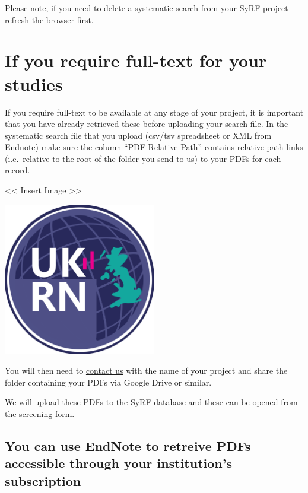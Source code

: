 \documentclass[
]{book}
\begin{document}
Please note, if you need to delete a systematic search from your SyRF project refresh the browser first.

\hypertarget{if-you-require-full-text-for-your-studies}{%
\section{If you require full-text for your studies}\label{if-you-require-full-text-for-your-studies}}

If you require full-text to be available at any stage of your project, it is important that you have already retrieved these before uploading your search file. In the systematic search file that you upload (csv/tsv spreadsheet or XML from Endnote) make sure the column ``PDF Relative Path'' contains relative path links (i.e.~relative to the root of the folder you send to us) to your PDFs for each record.

\textless{}\textless{} Insert Image \textgreater{}\textgreater{}

\includegraphics[width=0.5\textwidth,height=0.5\textheight]{figs/evidence-triangle.png}

You will then need to \href{syrf.info@ed.ac.uk}{contact us} with the name of your project and share the folder containing your PDFs via Google Drive or similar.

We will upload these PDFs to the SyRF database and these can be opened from the screening form.

\hypertarget{you-can-use-endnote-to-retreive-pdfs-accessible-through-your-institutions-subscription}{%
\subsection{You can use EndNote to retreive PDFs accessible through your institution's subscription}\label{you-can-use-endnote-to-retreive-pdfs-accessible-through-your-institutions-subscription}}
\end{document}
